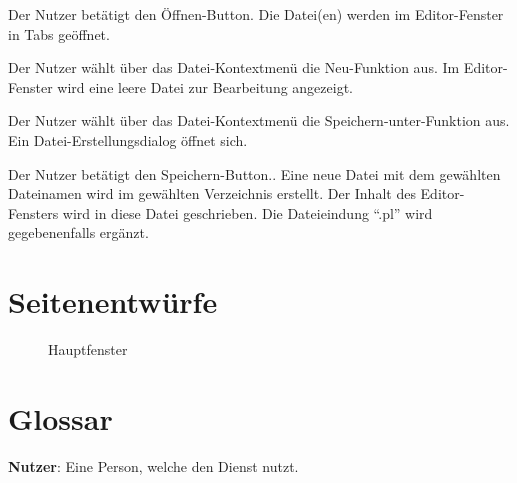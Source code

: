 \documentclass[parskip=full,11pt,twoside]{scrartcl}
\begin{document}
{Der Nutzer betätigt den Öffnen-Button.}
{Die Datei(en) werden im Editor-Fenster in Tabs geöffnet.}



{Der Nutzer wählt über das Datei-Kontextmenü die Neu-Funktion aus.}
{Im Editor-Fenster wird eine leere Datei zur Bearbeitung angezeigt.}

{Der Nutzer wählt über das Datei-Kontextmenü die Speichern-unter-Funktion aus.}
{Ein Datei-Erstellungsdialog öffnet sich.}

{Der Nutzer betätigt den Speichern-Button..}
{Eine neue Datei mit dem gewählten Dateinamen wird im gewählten Verzeichnis erstellt. Der Inhalt des Editor-Fensters wird in diese Datei geschrieben. Die Dateieindung \enquote{.pl} wird gegebenenfalls ergänzt.}

\pagebreak
\appendix

\section{Seitenentwürfe}

\begin{figure}[hb]
\caption{\label{fig:editor}
Hauptfenster
}
\end{figure}

\section{Glossar}

\textbf{Nutzer}:
Eine Person, welche den Dienst nutzt.
\end{document}

